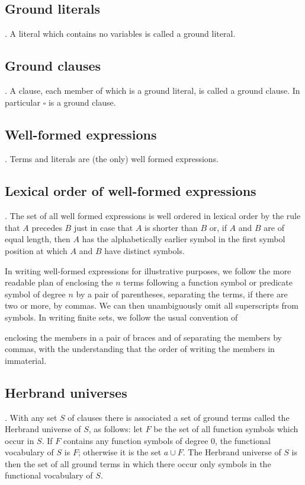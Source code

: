 \documentclass[8pt]{extarticle}
\begin{document}
\subsection{Ground literals}. A literal which contains no variables is called a ground literal.

\subsection{Ground clauses}. A clause, each member of which is a ground literal, is called a ground clause. In particular $\square$ is a ground clause.

\subsection{Well-formed expressions}. Terms and literals are (the only) well formed expressions.

\subsection{Lexical order of well-formed expressions}. The set of all well formed expressions is well ordered in lexical order by the rule that $A$ precedes $B$ just in case that $A$ is shorter than $B$ or, if $A$ and $B$ are of equal length, then $A$ has the alphabetically earlier symbol in the first symbol position at which $A$ and $B$ have distinct symbols.

In writing well-formed expressions for illustrative purposes, we follow the more readable plan of enclosing the $n$ terms following a function symbol or predicate symbol of degree $n$ by a pair of parentheses, separating the terms, if there are two or more, by commas. We can then unambiguously omit all superscripts from symbols. In writing finite sets, we follow the usual convention of

\newpage
\noindent enclosing the members in a pair of braces and of separating the members by commas, with the understanding that the order of writing the members in immaterial.

\subsection{Herbrand universes}. With any set $S$ of clauses there is associated a set of ground terms called the Herbrand universe of $S$, as follows: let $F$ be the set of all function symbols which occur in $S$. If $F$ contains any function symbols of degree 0, the functional vocabulary of $S$ is $F$; otherwise it is the set ${a}\cup F$. The Herbrand universe of $S$ is then the set of all ground terms in which there occur only symbols in the functional vocabulary of $S$.
\end{document}

